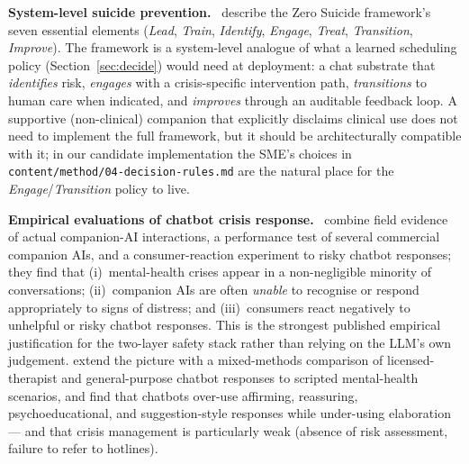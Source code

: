 \documentclass[10pt,conference]{article}
\newcommand{\secref}[1]{Section~\ref{#1}}
\renewcommand{\paragraph}[1]{\smallskip\par\noindent\textbf{#1}~\ignorespaces}
\begin{document}
\paragraph{System-level suicide prevention.}
\cite{Labouliere2018ZeroSuicide} describe the Zero Suicide framework's
seven essential elements (\emph{Lead}, \emph{Train}, \emph{Identify},
\emph{Engage}, \emph{Treat}, \emph{Transition}, \emph{Improve}).
The framework is a system-level analogue of what a learned scheduling
policy (\secref{sec:decide}) would need at deployment: a chat
substrate that \emph{identifies} risk, \emph{engages} with a
crisis-specific intervention path, \emph{transitions} to human
care when indicated, and \emph{improves} through an auditable
feedback loop. A supportive (non-clinical) companion that explicitly
disclaims clinical use does not need to implement the full framework,
but it should be architecturally compatible with it; in our candidate
implementation the SME's choices in
\texttt{content/method/04-decision-rules.md} are the natural place
for the \emph{Engage}/\emph{Transition} policy to live.

\paragraph{Empirical evaluations of chatbot crisis response.}
\cite{DeFreitas2024ChatbotSafety} combine field evidence of actual
companion-AI interactions, a performance test of several commercial
companion AIs, and a consumer-reaction experiment to risky chatbot
responses; they find that (i)~mental-health crises appear in a
non-negligible minority of conversations; (ii)~companion AIs are
often \emph{unable} to recognise or respond appropriately to signs of
distress; and (iii)~consumers react negatively to unhelpful or risky
chatbot responses. This is the strongest published empirical
justification for the two-layer safety stack rather than relying on
the LLM's own judgement.
\cite{Scholich2025TherapistVsChatbot} extend the picture with a
mixed-methods comparison of licensed-therapist and general-purpose
chatbot responses to scripted mental-health scenarios, and find that
chatbots over-use affirming, reassuring, psychoeducational, and
suggestion-style responses while under-using elaboration --- and that
crisis management is particularly weak (absence of risk assessment,
failure to refer to hotlines).
\end{document}
